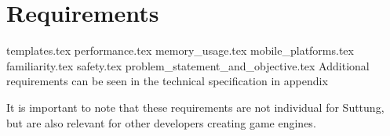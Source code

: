 \chapter{Requirements}
\label{chap:requirements}

{templates.tex}
{performance.tex}
{memory_usage.tex}
{mobile_platforms.tex}
{familiarity.tex}
{safety.tex}
{problem_statement_and_objective.tex}
Additional requirements can be seen in the technical specification in appendix 

It is important to note that these requirements are not individual for Suttung,
but are also relevant for other developers creating game engines.
